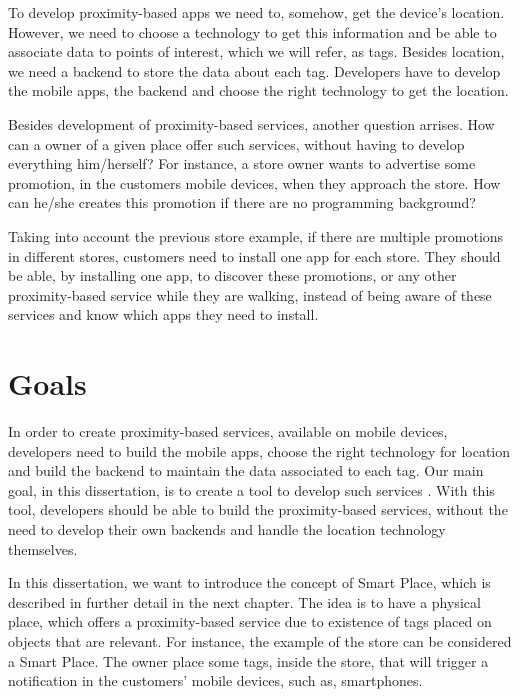 To develop proximity-based apps we need to, somehow, get the device's location.
However, we need to choose a technology to get this information and be able to associate data to points of interest, which we will refer, as tags.
Besides location, we need a backend to store the data about each tag.
Developers have to develop the mobile apps, the backend and choose the right technology to get the location.

Besides development of proximity-based services, another question arrises.
How can a owner of a given place offer such services, without having to develop everything him/herself?
For instance, a store owner wants to advertise some promotion, in the customers mobile devices, when they approach the store.
How can he/she creates this promotion if there are no programming background?

Taking into account the previous store example, if there are multiple promotions in different stores, customers need to install one app for each store.
They should be able, by installing one app, to discover these promotions, or any other proximity-based service while they are walking, instead of being aware of these services and know which apps they need to install.

\section{Goals}
\label{sec:introduction_goals}
In order to create proximity-based services, available on mobile devices, developers need to build the mobile apps, choose the right technology for location and build the backend to maintain the data associated to each tag.
Our main goal, in this dissertation, is to create a tool to develop such services%
.
With this tool, developers should be able to build the proximity-based services, without the need to develop their own backends and handle the location technology themselves.

In this dissertation, we want to introduce the concept of Smart Place, which is described in further detail in the next chapter.
The idea is to have a physical place, which offers a proximity-based service due to existence of tags placed on objects that are relevant.
For instance, the example of the store can be considered a Smart Place.
The owner place some tags, inside the store, that will trigger a notification in the customers' mobile devices, such as, smartphones.

